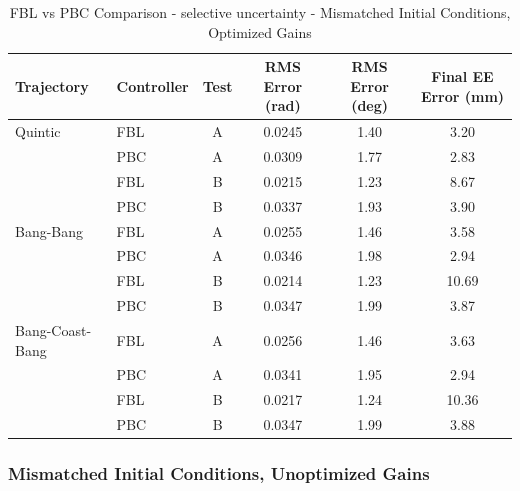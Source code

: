 \documentclass[11pt,a4paper]{article}
\begin{document}
\begin{table}[H]
\centering
\caption{FBL vs PBC Comparison - selective uncertainty - Mismatched Initial Conditions, Optimized Gains}
\begin{tabular}{llcccc}
\toprule
Trajectory & Controller & Test & RMS Error (rad) & RMS Error (deg) & Final EE Error (mm) \\
\midrule
Quintic & FBL & A & \textcolor{bestcolor}{0.0245} & \textcolor{bestcolor}{1.40} & 3.20 \\
 & PBC & A & 0.0309 & 1.77 & \textcolor{bestcolor}{2.83} \\
 & FBL & B & \textcolor{bestcolor}{0.0215} & \textcolor{bestcolor}{1.23} & 8.67 \\
 & PBC & B & 0.0337 & 1.93 & \textcolor{bestcolor}{3.90} \\
\midrule
Bang-Bang & FBL & A & \textcolor{bestcolor}{0.0255} & \textcolor{bestcolor}{1.46} & 3.58 \\
 & PBC & A & 0.0346 & 1.98 & \textcolor{bestcolor}{2.94} \\
 & FBL & B & \textcolor{bestcolor}{0.0214} & \textcolor{bestcolor}{1.23} & 10.69 \\
 & PBC & B & 0.0347 & 1.99 & \textcolor{bestcolor}{3.87} \\
\midrule
Bang-Coast-Bang & FBL & A & \textcolor{bestcolor}{0.0256} & \textcolor{bestcolor}{1.46} & 3.63 \\
 & PBC & A & 0.0341 & 1.95 & \textcolor{bestcolor}{2.94} \\
 & FBL & B & \textcolor{bestcolor}{0.0217} & \textcolor{bestcolor}{1.24} & 10.36 \\
 & PBC & B & 0.0347 & 1.99 & \textcolor{bestcolor}{3.88} \\
\bottomrule
\end{tabular}
\end{table}

\subsubsection{Mismatched Initial Conditions, Unoptimized Gains}
\end{document}
